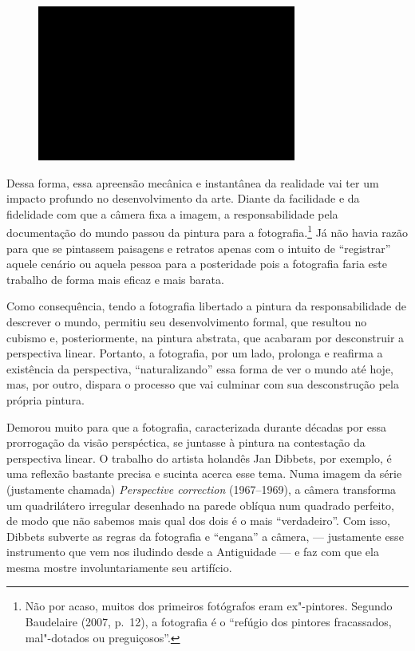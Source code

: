 \begin{figure}[!ht]

\centering
 \includegraphics[width=85mm]{./imgs/im1.jpg}
\caption{\tiny{}}

\end{figure}

Dessa forma, essa apreensão mecânica e instantânea da realidade vai ter
um impacto profundo no desenvolvimento da arte. Diante da facilidade e
da fidelidade com que a câmera fixa a imagem, a responsabilidade pela
documentação do mundo passou da pintura para a fotografia.\footnote{Não
  por acaso, muitos dos primeiros fotógrafos eram ex"-pintores. Segundo
  Baudelaire (2007, p.~12), a fotografia é o ``refúgio dos pintores
  fracassados, mal"-dotados ou preguiçosos''.} Já não havia razão para
que se pintassem paisagens e retratos apenas com o intuito de
``registrar'' aquele cenário ou aquela pessoa para a posteridade pois a
fotografia faria este trabalho de forma mais eficaz e mais barata.

Como consequência, tendo a fotografia libertado a pintura da responsabilidade
de descrever o mundo, permitiu seu desenvolvimento formal, que resultou
no cubismo e, posteriormente, na pintura abstrata, que acabaram por
desconstruir a perspectiva linear. Portanto, a fotografia, por um lado,
prolonga e reafirma a existência da perspectiva, ``naturalizando'' essa
forma de ver o mundo até hoje, mas, por outro, dispara o processo que
vai culminar com sua desconstrução pela própria pintura.

Demorou muito para que a fotografia, caracterizada durante décadas por
essa prorrogação da visão perspéctica, se juntasse à pintura na
contestação da perspectiva linear. O trabalho do artista holandês Jan
Dibbets, por exemplo, é uma reflexão bastante precisa e sucinta acerca
esse tema. Numa imagem da série (justamente chamada) \emph{Perspective
correction} (1967--1969), a câmera transforma um quadrilátero irregular
desenhado na parede oblíqua num quadrado perfeito, de modo que não
sabemos mais qual dos dois é o mais ``verdadeiro''. Com isso, Dibbets
subverte as regras da fotografia e ``engana'' a câmera, --- justamente
esse instrumento que vem nos iludindo desde a Antiguidade --- e faz com
que ela mesma mostre involuntariamente seu artifício.

